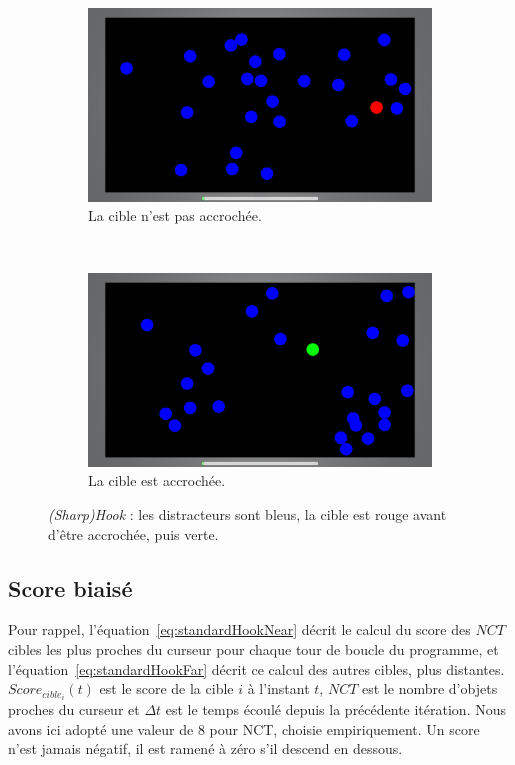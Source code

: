 	\begin{figure}[htb]
		\begin{subfigure}[t]{0.49\textwidth}
			\centering
			\includegraphics[width=\textwidth]{figures/ch5/hook_red}
			\caption{La cible n'est pas accrochée.}
			\label{fig:hook_red}
		\end{subfigure}
		~
		\begin{subfigure}[t]{0.49\textwidth}
			\centering
			\includegraphics[width=\textwidth]{figures/ch5/hook_green}
			\caption{La cible est accrochée.}
			\label{fig:hook_green}
		\end{subfigure}
		\caption[Application pour l'évaluation de \emph{SharpHook}]{\emph{(Sharp)Hook} : les distracteurs sont bleus, la cible est rouge avant d'être accrochée, puis verte.}
		\label{fig:hook_red_green}
	\end{figure}

	
	\subsection{Score biaisé}
	Pour rappel, l'équation~\ref{eq:standardHookNear} décrit le calcul du score des $NCT$ cibles les plus proches du curseur pour chaque tour de boucle du programme, et l'équation~\ref{eq:standardHookFar} décrit ce calcul des autres cibles, plus distantes. $Score_{cible_{i}}(t)$ est le score de la cible $i$ à l'instant $t$, $NCT$ est le nombre d'objets proches du curseur et $\Delta{}t$ est le temps écoulé depuis la précédente itération. Nous avons ici adopté une valeur de 8 pour NCT, choisie empiriquement. Un score n'est jamais négatif, il est ramené à zéro s'il descend en dessous.
	
